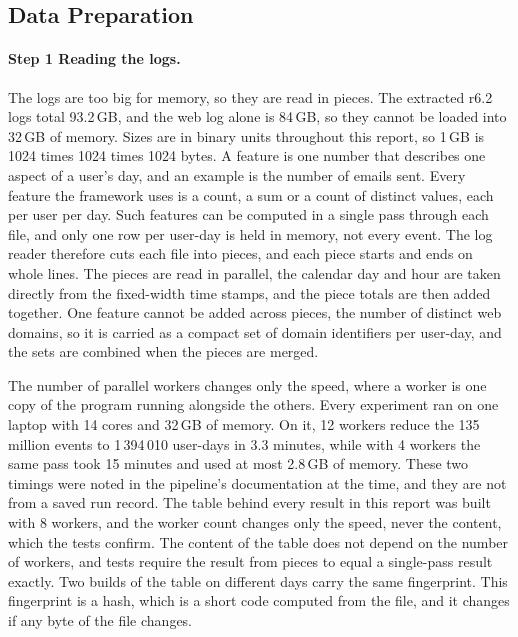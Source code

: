 \documentclass[a4paper,12pt]{article}
\begin{document}
\subsection{Data Preparation}
\label{sec:data}
\paragraph{Step 1 Reading the logs.} The logs are too big for memory, so they are read in pieces. The extracted r6.2 logs total 93.2\,GB, and the web log alone is 84\,GB, so they cannot be loaded into 32\,GB of memory. Sizes are in binary units throughout this report, so 1\,GB is 1024 times 1024 times 1024 bytes. A feature is one number that describes one aspect of a user's day, and an example is the number of emails sent. Every feature the framework uses is a count, a sum or a count of distinct values, each per user per day. Such features can be computed in a single pass through each file, and only one row per user-day is held in memory, not every event. The log reader therefore cuts each file into pieces, and each piece starts and ends on whole lines. The pieces are read in parallel, the calendar day and hour are taken directly from the fixed-width time stamps, and the piece totals are then added together. One feature cannot be added across pieces, the number of distinct web domains, so it is carried as a compact set of domain identifiers per user-day, and the sets are combined when the pieces are merged.

The number of parallel workers changes only the speed, where a worker is one copy of the program running alongside the others. Every experiment ran on one laptop with 14 cores and 32\,GB of memory. On it, 12 workers reduce the 135 million events to 1\,394\,010 user-days in 3.3 minutes, while with 4 workers the same pass took 15 minutes and used at most 2.8\,GB of memory. These two timings were noted in the pipeline's documentation at the time, and they are not from a saved run record. The table behind every result in this report was built with 8 workers, and the worker count changes only the speed, never the content, which the tests confirm. The content of the table does not depend on the number of workers, and tests require the result from pieces to equal a single-pass result exactly. Two builds of the table on different days carry the same fingerprint. This fingerprint is a hash, which is a short code computed from the file, and it changes if any byte of the file changes.
\end{document}
